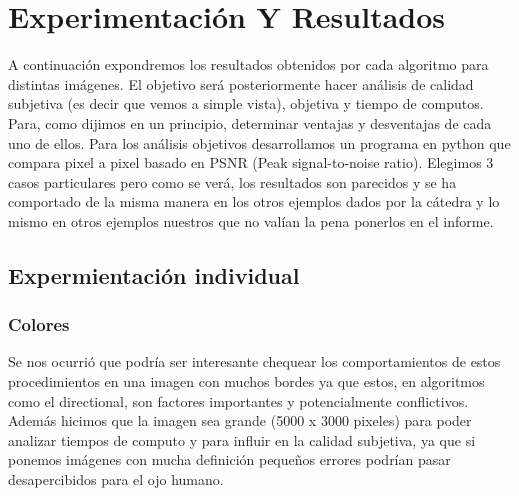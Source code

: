 \section{Experimentación Y Resultados}

A continuación expondremos los resultados obtenidos por cada algoritmo para distintas imágenes. El objetivo será posteriormente hacer análisis de calidad subjetiva (es decir que vemos a simple vista), objetiva y tiempo de computos. Para, como dijimos en un principio, determinar ventajas y desventajas de cada uno de ellos. Para los análisis objetivos desarrollamos un programa en python que compara pixel a pixel basado en PSNR (Peak signal-to-noise ratio). Elegimos 3 casos particulares pero como se verá, los resultados son parecidos y se ha comportado de la misma manera en los otros ejemplos dados por la cátedra y lo mismo en otros ejemplos nuestros que no valían la pena ponerlos en el informe.

\subsection{Expermientación individual}

\subsubsection{Colores}


Se nos ocurrió que podría ser interesante chequear los comportamientos de estos procedimientos en una imagen con muchos bordes ya que estos, en algoritmos como el directional, son factores importantes y potencialmente conflictivos. Además hicimos que la imagen sea grande (5000 x 3000 pixeles) para poder analizar tiempos de computo y para influir en la calidad subjetiva, ya que si ponemos imágenes con mucha definición pequeños errores podrían pasar desapercibidos para el ojo humano.

